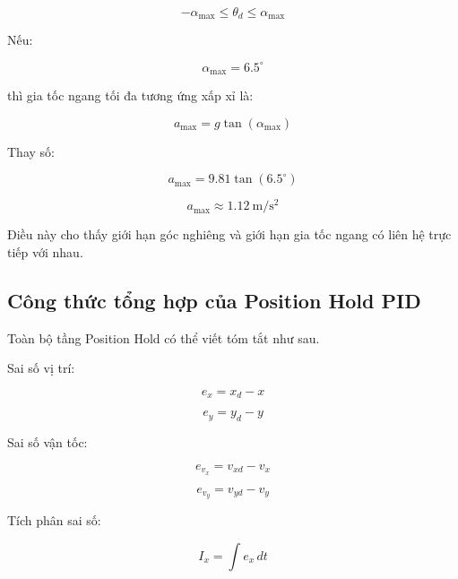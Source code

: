 \begin{equation}
    -\alpha_{\max}
    \leq
    \theta_d
    \leq
    \alpha_{\max}
\end{equation}

Nếu:

\begin{equation}
    \alpha_{\max} = 6.5^\circ
\end{equation}

thì gia tốc ngang tối đa tương ứng xấp xỉ là:

\begin{equation}
    a_{\max}
    =
    g\tan(\alpha_{\max})
\end{equation}

Thay số:

\begin{equation}
    a_{\max}
    =
    9.81\tan(6.5^\circ)
\end{equation}

\begin{equation}
    a_{\max}
    \approx
    1.12\ \mathrm{m/s^2}
\end{equation}

Điều này cho thấy giới hạn góc nghiêng và giới hạn gia tốc ngang có liên hệ
trực tiếp với nhau.

\subsection{Công thức tổng hợp của Position Hold PID}

Toàn bộ tầng Position Hold có thể viết tóm tắt như sau.

Sai số vị trí:

\begin{equation}
    e_x = x_d - x
\end{equation}

\begin{equation}
    e_y = y_d - y
\end{equation}

Sai số vận tốc:

\begin{equation}
    e_{v_x} = v_{xd} - v_x
\end{equation}

\begin{equation}
    e_{v_y} = v_{yd} - v_y
\end{equation}

Tích phân sai số:

\begin{equation}
    I_x = \int e_x\,dt
\end{equation}

